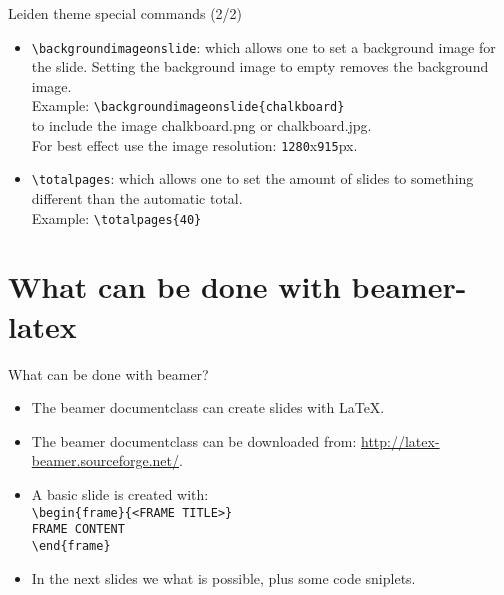 \begin{frame}[fragile]{Leiden theme special commands (2/2)}
\begin{itemize}
\item	\alert{\texttt{\textbackslash backgroundimageonslide}}: which
		allows one to set a background image for the slide.
		Setting the background image to empty removes the
		background image.\\
\vspace{0.2\baselineskip}
		Example: \verb|\backgroundimageonslide{chalkboard}|\\
\vspace{0.1\baselineskip}
		to include the image chalkboard.png or chalkboard.jpg.\\
		For best effect use the image resolution: \texttt{1280}x\texttt{915}px.
\vspace{0.5\baselineskip}

\item	\alert{\texttt{\textbackslash totalpages}}: which allows
		one to set the amount of slides to something different
		than the automatic total.\\
\vspace{0.2\baselineskip}
		Example: \verb|\totalpages{40}|
\end{itemize}
\end{frame}


\section{What can be done with beamer-latex}

\begin{frame}[fragile]{What can be done with beamer?}
\begin{itemize}
\item	The beamer documentclass can create slides with \LaTeX.
\item	The beamer documentclass can be downloaded from:
		\url{http://latex-beamer.sourceforge.net/}.
\item	A basic slide is created with:\\
\vspace{0.1\baselineskip}
\verb|\begin{frame}{<FRAME TITLE>}|\\
\verb|FRAME CONTENT|\\
\verb|\end{frame}|\\
\vspace{0.5\baselineskip}
\item	In the next slides we what is possible, plus some
		code sniplets.
\end{itemize}
\end{frame}


